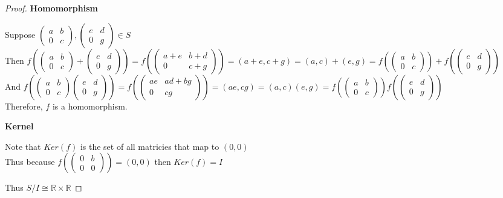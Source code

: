\documentclass{article} %
\begin{document}
\begin{addmargin}[1em]{0em}
\begin{proof}
\textbf{Homomorphism}
\begin{addmargin}[1em]{0em}
Suppose $\left( \begin{matrix} a & b \\ 0 & c \end{matrix} \right), \left( \begin{matrix} e & d \\ 0 & g \end{matrix} \right) \in S$
\\Then $f(\left(\begin{matrix} a & b \\ 0 & c \end{matrix} \right) + \left( \begin{matrix} e & d \\ 0 & g\end{matrix} \right)) = f( \left( \begin{matrix} a + e & b + d \\ 0 & c + g \end{matrix} \right) ) = (a + e, c + g) = (a,c) + (e,g) = f( \left( \begin{matrix} a & b \\ 0 & c \end{matrix} \right) ) + f(\left(  \begin{matrix}  e & d \\ 0 & g\end{matrix} \right) )$
\\And $f(\left(\begin{matrix} a & b \\ 0 & c \end{matrix} \right) \left( \begin{matrix} e & d \\ 0 & g\end{matrix} \right)) = f(\left( \begin{matrix} ae & ad + bg \\ 0 & cg \end{matrix} \right) ) = (ae, cg) = (a,c)(e,g) = f( \left( \begin{matrix} a & b \\ 0 & c \end{matrix} \right) )  f(\left(  \begin{matrix}  e & d \\ 0 & g\end{matrix} \right) )$
\\Therefore, $f$ is a homomorphism.
\end{addmargin}
\textbf{Kernel}
\begin{addmargin}[1em]{0em}
Note that $Ker(f)$ is the set of all matricies that map to $(0,0)$
\\Thus because $f( \left( \begin{matrix} 0 & b \\ 0 & 0\end{matrix}  \right) ) = (0,0)$ then $Ker(f) = I$
\end{addmargin}
Thus $S/I \cong \mathbb{R} \times \mathbb{R}$
\end{proof}
\end{addmargin}
\end{document}
